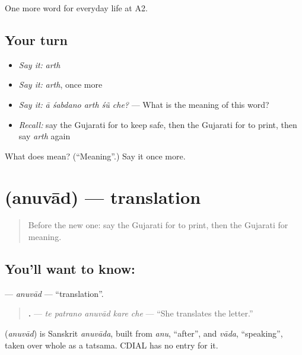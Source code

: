 \begin{grammarlens}[title={What you've built}]
One more word for everyday life at A2.
\end{grammarlens}

\subsection*{Your turn}
\begin{itemize}
\raggedright
  \item \emph{Say it:} \emph{arth}
  \item \emph{Say it:} \emph{arth}, once more
  \item \emph{Say it:} \emph{ā śabdano arth śũ che?} — What is the meaning of this word?
  \item \emph{Recall:} say the Gujarati for to keep safe, then the Gujarati for to print, then say \emph{arth} again
\end{itemize}

\begin{tcolorbox}[breakable,colback=teal!4,colframe=teal!35!black,title={Before you move on}]
What does  mean? (\textquotedblleft{}Meaning\textquotedblright{}.) Say it once more.
\end{tcolorbox}
\section[\texorpdfstring{\gu{અનુવાદ} (anuvād)}{અનુવાદ (anuvād)}]{ (anuvād) — translation}

\label{lesson:GU-C251-anuvad}



\begin{quote}
Before the new one: say the Gujarati for to print, then the Gujarati for meaning.
\end{quote}

\subsection*{You'll want to know: }
\textbf{} — \emph{anuvād} — \textquotedblleft{}translation\textquotedblright{}.

\begin{quote}
\textbf{    .} — \emph{te patrano anuvād kare che} — \textquotedblleft{}She translates the letter.\textquotedblright{}
\end{quote}

\begin{cousinweb}
\textbf{} (\emph{anuvād}) is Sanskrit \emph{anuvāda}, built from \emph{anu}, \textquotedblleft{}after\textquotedblright{}, and \emph{vāda}, \textquotedblleft{}speaking\textquotedblright{}, taken over whole as a tatsama. CDIAL has no entry for it.
\end{cousinweb}

